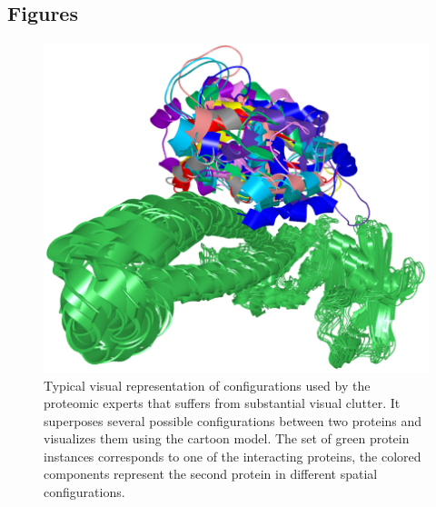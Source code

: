 \documentclass{bmcart}
\begin{document}
\begin{backmatter}


\section*{Figures}
  \begin{figure}[h!]
  \centering
  \includegraphics[width=0.9\columnwidth]{images/figure1.png}
 \caption{
	Typical visual representation of configurations used by the proteomic experts that suffers from substantial visual clutter. It superposes several possible configurations between two proteins and visualizes them using the cartoon model. The set of green protein instances corresponds to one of the interacting proteins, the colored components represent the second protein in different spatial configurations.}
  \label{fig:problem}
\end{figure}


\end{backmatter}
\end{document}
